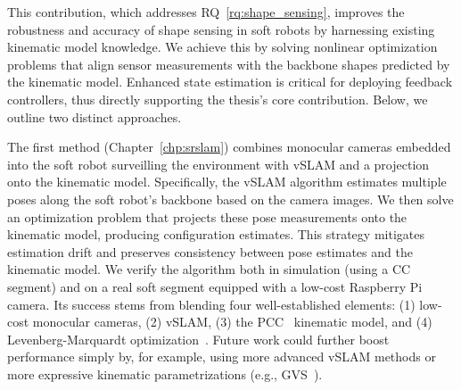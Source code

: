 
This contribution, which addresses \gls{RQ}~\ref{rq:shape_sensing}, improves the robustness and accuracy of shape sensing in soft robots by harnessing existing kinematic model knowledge.
We achieve this by solving nonlinear optimization problems that align sensor measurements with the backbone shapes predicted by the kinematic model.
Enhanced state estimation is critical for deploying feedback controllers, thus directly supporting the thesis’s core contribution.
Below, we outline two distinct approaches.

The first method (Chapter~\ref{chp:srslam}) combines monocular cameras embedded into the soft robot surveilling the environment with \gls{vSLAM} and a projection onto the kinematic model.
Specifically, the \gls{vSLAM} algorithm estimates multiple poses along the soft robot’s backbone based on the camera images. We then solve an optimization problem that projects these pose measurements onto the kinematic model, producing configuration estimates. This strategy mitigates estimation drift and preserves consistency between pose estimates and the kinematic model. We verify the algorithm both in simulation (using a \gls{CC} segment) and on a real soft segment equipped with a low-cost Raspberry Pi camera. Its success stems from blending four well-established elements: (1) low-cost monocular cameras, (2) \gls{vSLAM}, (3) the \gls{PCC}~\citep{webster2010design} kinematic model, and (4) Levenberg-Marquardt optimization~\citep{levenberg1944method, marquardt1963algorithm}. Future work could further boost performance simply by, for example, using more advanced \gls{vSLAM} methods or more expressive kinematic parametrizations (e.g., \gls{GVS}~\citep{renda2020geometric}).

